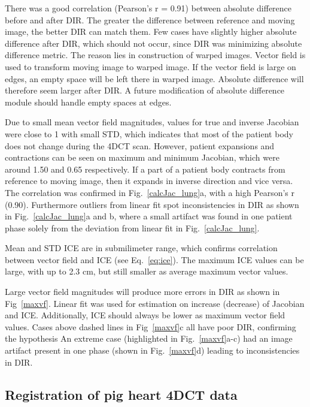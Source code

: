 \documentclass[type=dr, dr=rernat, accentcolor=tud7b,colorbacktitle, bigchapter, openright, twoside, 12pt ]{tudthesis}
\begin{document}
There was a good correlation (Pearson's r = 0.91) between absolute difference before and after DIR. The greater the difference between reference and moving image, the better DIR can match them. Few cases
have slightly higher absolute difference after DIR, which should not occur, since DIR was minimizing absolute difference metric. The reason lies in construction of warped images. Vector field is used to transform
moving image to warped image. If the vector field is large on edges, an empty space will be left there in warped image. Absolute difference will therefore seem larger after DIR. A future modification of absolute difference
module should handle empty spaces at edges.

Due to small mean vector field magnitudes, values for true and inverse Jacobian were close to 1 with small STD, which indicates that most of the patient body does not change during the 4DCT scan.
However, patient expansions and contractions can be seen on maximum and minimum Jacobian, which were around 1.50 and 0.65 respectively. If a part of a patient body contracts from reference to moving image, 
then it expands in inverse direction and vice versa. The correlation was confirmed in Fig.~\ref{calcJac_lung}a, with a high Pearson's r (0.90). Furthermore outliers from linear fit spot inconsistencies
in DIR as shown in Fig.~\ref{calcJac_lung}a and b, where a small artifact was found in one patient phase solely from the deviation from linear fit in Fig.~\ref{calcJac_lung}.

Mean and STD ICE are in submilimeter range, which confirms correlation between vector field and ICE (see Eq.~\ref{eq:ice}). The maximum ICE values can be large, with up to 2.3 cm, 
but still smaller as average maximum vector values. 

Large vector field magnitudes will produce more errors in DIR as shown in Fig~\ref{maxvf}. Linear fit was used for estimation on increase (decrease) of Jacobian and ICE. Additionally, ICE
should always be lower as maximum vector field values. Cases above dashed lines in Fig~\ref{maxvf}c all have poor DIR, confirming the hypothesis An extreme case (highlighted in Fig.~\ref{maxvf}a-c)
had an image artifact present in one phase (shown in Fig.~\ref{maxvf}d) leading to inconsistencies in DIR.


\newpage
\subsection{Registration of pig heart 4DCT data}
\end{document}
